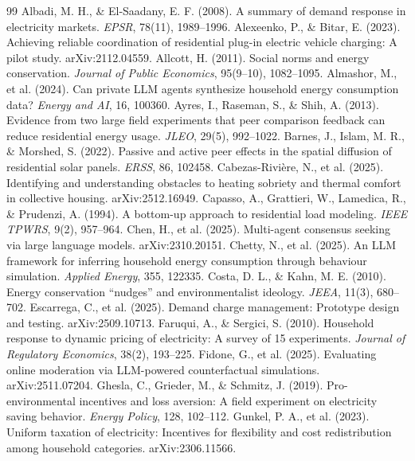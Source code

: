 \documentclass[11pt]{article}
\begin{document}
\begin{thebibliography}{99}
\small
{} Albadi, M. H., \& El-Saadany, E. F. (2008). A summary of demand response in electricity markets. \emph{EPSR}, 78(11), 1989--1996.
 Alexeenko, P., \& Bitar, E. (2023). Achieving reliable coordination of residential plug-in electric vehicle charging: A pilot study. arXiv:2112.04559.
 Allcott, H. (2011). Social norms and energy conservation. \emph{Journal of Public Economics}, 95(9--10), 1082--1095.
 Almashor, M., et al. (2024). Can private LLM agents synthesize household energy consumption data? \emph{Energy and AI}, 16, 100360.
 Ayres, I., Raseman, S., \& Shih, A. (2013). Evidence from two large field experiments that peer comparison feedback can reduce residential energy usage. \emph{JLEO}, 29(5), 992--1022.
 Barnes, J., Islam, M. R., \& Morshed, S. (2022). Passive and active peer effects in the spatial diffusion of residential solar panels. \emph{ERSS}, 86, 102458.
 Cabezas-Rivi\`ere, N., et al. (2025). Identifying and understanding obstacles to heating sobriety and thermal comfort in collective housing. arXiv:2512.16949.
 Capasso, A., Grattieri, W., Lamedica, R., \& Prudenzi, A. (1994). A bottom-up approach to residential load modeling. \emph{IEEE TPWRS}, 9(2), 957--964.
 Chen, H., et al. (2025). Multi-agent consensus seeking via large language models. arXiv:2310.20151.
 Chetty, N., et al. (2025). An LLM framework for inferring household energy consumption through behaviour simulation. \emph{Applied Energy}, 355, 122335.
 Costa, D. L., \& Kahn, M. E. (2010). Energy conservation ``nudges'' and environmentalist ideology. \emph{JEEA}, 11(3), 680--702.
 Escarrega, C., et al. (2025). Demand charge management: Prototype design and testing. arXiv:2509.10713.
 Faruqui, A., \& Sergici, S. (2010). Household response to dynamic pricing of electricity: A survey of 15 experiments. \emph{Journal of Regulatory Economics}, 38(2), 193--225.
 Fidone, G., et al. (2025). Evaluating online moderation via LLM-powered counterfactual simulations. arXiv:2511.07204.
 Ghesla, C., Grieder, M., \& Schmitz, J. (2019). Pro-environmental incentives and loss aversion: A field experiment on electricity saving behavior. \emph{Energy Policy}, 128, 102--112.
 Gunkel, P. A., et al. (2023). Uniform taxation of electricity: Incentives for flexibility and cost redistribution among household categories. arXiv:2306.11566.

\end{thebibliography}
\end{document}
